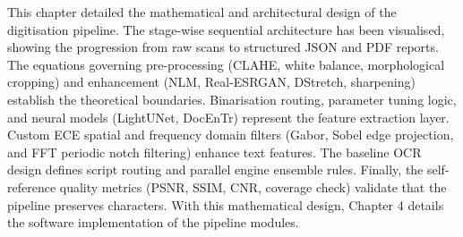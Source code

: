 This chapter detailed the mathematical and architectural design of the digitisation pipeline. The stage-wise sequential architecture has been visualised, showing the progression from raw scans to structured JSON and PDF reports. The equations governing pre-processing (CLAHE, white balance, morphological cropping) and enhancement (NLM, Real-ESRGAN, DStretch, sharpening) establish the theoretical boundaries. Binarisation routing, parameter tuning logic, and neural models (LightUNet, DocEnTr) represent the feature extraction layer. Custom ECE spatial and frequency domain filters (Gabor, Sobel edge projection, and FFT periodic notch filtering) enhance text features. The baseline OCR design defines script routing and parallel engine ensemble rules. Finally, the self-reference quality metrics (PSNR, SSIM, CNR, coverage check) validate that the pipeline preserves characters. With this mathematical design, Chapter 4 details the software implementation of the pipeline modules.